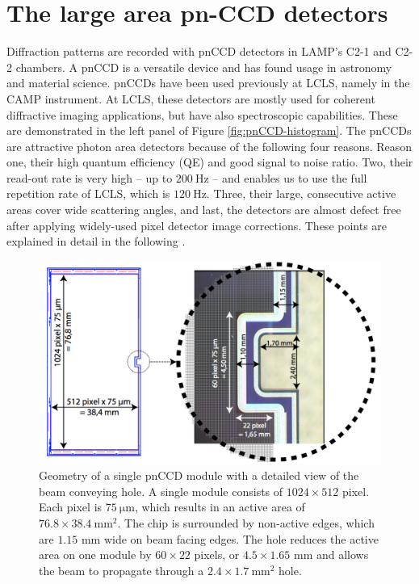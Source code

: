\section{The large area pn-CCD detectors}\label{sec:pnCCD}
Diffraction patterns are recorded with pnCCD detectors in LAMP's C2-1 and C2-2 chambers. A pnCCD is a versatile device and has found usage in astronomy and material science. pnCCDs have been used previously at LCLS, namely in the CAMP instrument. At LCLS, these detectors are mostly used for coherent diffractive imaging applications, but have also spectroscopic capabilities. These are demonstrated in the left panel of Figure \ref{fig:pnCCD-histogram}. The pnCCDs are attractive photon area detectors because of the following four reasons. Reason one, their high quantum efficiency (QE) and good signal to noise ratio. Two, their read-out rate is very high -- up to $\SI{200}{\hertz}$ -- and enables us to use the full repetition rate of LCLS, which is $\SI{120}{\hertz}$. Three, their large, consecutive active areas cover wide scattering angles, and last, the detectors are almost defect free after applying widely-used pixel detector image corrections. These points are explained in detail in the following \citep{Bucher-2016-Unpublished}.\\[1\baselineskip]
%
\begin{figure}
   \includegraphics[width=0.8\linewidth]{images/pnCCD-detail.png}
    \caption[Geometry of a single pnCCD module.]{Geometry of a single pnCCD module with a detailed view of the beam conveying hole. A single module consists of $1024 \times 512$ pixel. Each pixel is $\SI{75}{\micro\meter}$, which results in an active area of $76.8 \times \SI{38.4}{\milli\meter\squared}$. The chip is surrounded by non-active edges, which are $1.15$ mm wide on beam facing edges. The hole reduces the active area on one module by $60\times 22$ pixels, or $4.5 \times 1.65$ mm and allows the beam to propagate through a $2.4 \times \SI{1.7}{\milli\meter\squared}$ hole.}
\label{fig:ccd-detail}
\end{figure}
